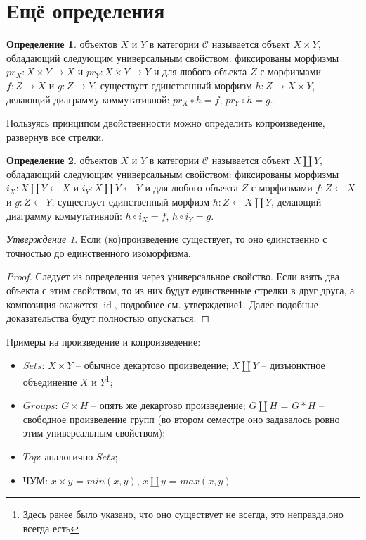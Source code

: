 \documentclass[a4paper]{article}
\theoremstyle{indented}
\theoremstyle{definition}
\newtheorem{defn}{Определение}
\theoremstyle{remark}
\newtheorem{stat}{Утверждение}
\DeclareMathOperator{\id}{id}
\begin{document}
\section{Ещё определения}
\begin{defn}
     объектов $X$ и $Y$ в категории $\mathcal{C}$ называется объект $X\times Y$, обладающий следующим универсальным свойством: фиксированы морфизмы $pr_{X}: X\times Y\rightarrow X$ и $pr_{Y}: X\times Y\rightarrow Y$ и для любого объекта $Z$ с морфизмами $f: Z\rightarrow X$ и $g: Z\rightarrow Y$, существует единственный морфизм $h: Z\rightarrow X\times Y$, делающий диаграмму коммутативной: $pr_{X} \circ  h = f$, $pr_{Y} \circ  h = g$.
\end{defn}
Пользуясь принципом двойственности можно определить копроизведение, развернув все стрелки.
\begin{defn}
     объектов $X$ и $Y$ в категории $\mathcal{C}$ называется объект $X\amalg Y$, обладающий следующим универсальным свойством: фиксированы морфизмы $i_{X}: X\amalg Y\leftarrow X$ и $i_{Y}: X\amalg Y\leftarrow Y$ и для любого объекта $Z$ с морфизмами $f: Z\leftarrow X$ и $g: Z\leftarrow Y$, существует единственный морфизм $h: Z\leftarrow X\amalg Y$, делающий диаграмму коммутативной: $h \circ  i_{X} = f$, $h \circ  i_{Y} = g$.
\end{defn}
\begin{stat}
    Если (ко)произведение существует, то оно единственно с точностью до единственного изоморфизма.
\end{stat}
\begin{proof}
    Следует из определения через универсальное свойство. Если взять два объекта с этим свойством, то из них будут единственные стрелки в друг друга, а композиция окажется $\id$, подробнее см. утверждение1. Далее подобные доказательства будут полностью опускаться.
\end{proof}
Примеры на произведение и копроизведение:
\begin{itemize}
    \item $Sets$: $X\times Y$ -- обычное декартово произведение; $X\amalg Y$ -- дизъюнктное объединение $X$ и $Y$\footnote{Здесь ранее было указано, что оно существует не всегда, это неправда,оно всегда есть};
    \item $Groups$: $G\times H$ -- опять же декартово произведение; $G\amalg H$ = $G\ast H$ -- свободное произведение групп (во втором семестре оно задавалось ровно этим универсальным свойством);
    \item $Top$: аналогично $Sets$;
    \item ЧУМ: $x\times y$ = $min(x, y)$, $x\amalg y$ = $max(x, y)$.
\end{itemize}
\end{document}
